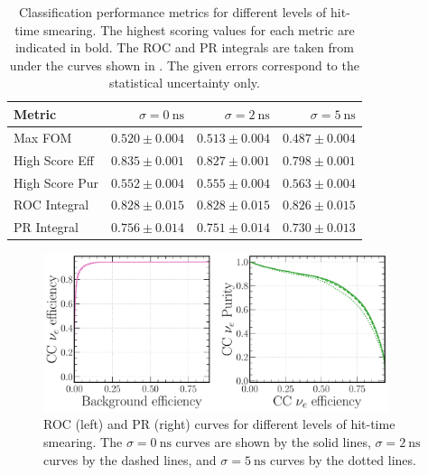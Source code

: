 \begin{table} %
    \begin{tabular}{lrrr}
        Metric         & $\sigma=0~\text{ns}$ & $\sigma=2~\text{ns}$ & $\sigma=5~\text{ns}$ \\
        \midrule
        Max FOM        & \textbf{$0.520\pm0.004$} & $0.513\pm0.004$  & $0.487\pm0.004$      \\
        High Score Eff & \textbf{$0.835\pm0.001$} & $0.827\pm0.001$  & $0.798\pm0.001$      \\
        High Score Pur & $0.552\pm0.004$          & $0.555\pm0.004$  & \textbf{$0.563\pm0.004$} \\
        ROC Integral   & \textbf{$0.828\pm0.015$} & $0.828\pm0.015$  & $0.826\pm0.015$      \\
        PR Integral    & \textbf{$0.756\pm0.014$} & $0.751\pm0.014$  & $0.730\pm0.013$      \\
    \end{tabular}
    \caption[Classification performance metrics for different levels of hit-time smearing]
    {Classification performance metrics for different levels of hit-time smearing. The highest
        scoring values for each metric are indicated in bold. The ROC and PR integrals are taken
        from under the curves shown in . The given
        errors correspond to the statistical uncertainty only.}
    \label{tab:calib_time}
\end{table}

\begin{figure} %
    \includegraphics[width=0.9\textwidth]{diagrams/7-results/calib_time_nuel_comp_curves.pdf}
    \caption[Receiver operating characteristic and precision-recall curves for different levels of
        hit-time smearing] {ROC (left) and PR (right) curves for different levels of hit-time
        smearing. The $\sigma=0~\text{ns}$ curves are shown by the solid lines,
        $\sigma=2~\text{ns}$ curves by the dashed lines, and $\sigma=5~\text{ns}$ curves by the
        dotted lines.}
    \label{fig:calib_time_nuel_comp_curves}
\end{figure}

